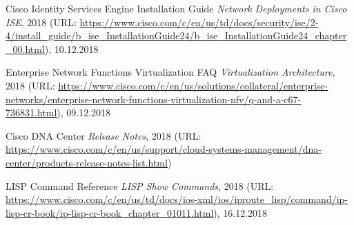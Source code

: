 \begin{thebibliography}{}
	 Cisco Identity Services Engine Installation Guide \textit{Network Deployments in Cisco ISE}, 2018 (URL: \url{https://www.cisco.com/c/en/us/td/docs/security/ise/2-4/install_guide/b_ise_InstallationGuide24/b_ise_InstallationGuide24_chapter_00.html}), 10.12.2018

	 Enterprise Network Functions Virtualization FAQ \textit{Virtualization Architecture}, 2018 (URL: \url{https://www.cisco.com/c/en/us/solutions/collateral/enterprise-networks/enterprise-network-functions-virtualization-nfv/q-and-a-c67-736831.html}), 09.12.2018
	
	 Cisco DNA Center \textit{Release Notes}, 2018 (URL: \url{https://www.cisco.com/c/en/us/support/cloud-systems-management/dna-center/products-release-notes-list.html})
	
	 LISP Command Reference \textit{LISP Show Commands}, 2018 (URL: \url{https://www.cisco.com/c/en/us/td/docs/ios-xml/ios/iproute_lisp/command/ip-lisp-cr-book/ip-lisp-cr-book_chapter_01011.html}), 16.12.2018
	
\end{thebibliography}
